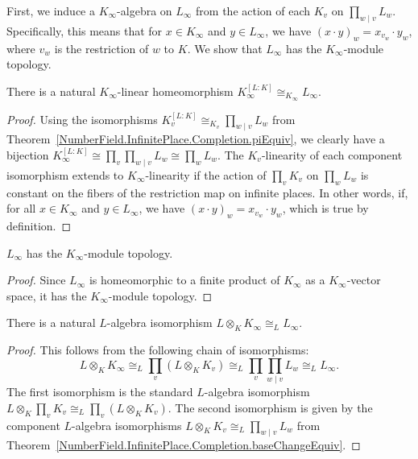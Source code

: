 First, we induce a $K_{\infty}$-algebra on $L_{\infty}$ from the action of each $K_v$ on
$\prod_{w\mid v}L_w$.
Specifically, this means that for $x \in K_{\infty}$ and $y \in L_{\infty}$, we have
$(x \cdot y)_w = x_{v_w} \cdot y_w$, where $v_w$ is the restriction of $w$ to $K$.
We show that $L_{\infty}$ has the $K_{\infty}$-module topology.

\begin{theorem}
  \label{NumberField.InfiniteAdeleRing.piEquiv}
  \leanok
  There is a natural $K_{\infty}$-linear homeomorphism
  $K_{\infty}^{[L:K]} \cong_{K_{\infty}} L_{\infty}$.
\end{theorem}
\begin{proof}
  Using the isomorphisms $K_v^{[L:K]} \cong_{K_v} \prod_{w\mid v}L_w$ from
  Theorem~\ref{NumberField.InfinitePlace.Completion.piEquiv}, we clearly have a bijection
  $K_{\infty}^{[L:K]} \cong \prod_v\prod_{w \mid v} L_w \cong \prod_w L_w$.
  The $K_v$-linearity of each component isomorphism extends to $K_{\infty}$-linearity if the
  action of $\prod_v K_v$ on $\prod_w L_w$ is constant on the fibers of the restriction map on
  infinite places.
  In other words, if, for all $x \in K_{\infty}$ and $y \in L_{\infty}$, we have
  $(x \cdot y)_w = x_{v_w} \cdot y_w$, which is true by definition.
\end{proof}

\begin{theorem}
  \label{NumberField.InfiniteAdeleRing.instIsModuleTopology_fLT}
  \leanok
  $L_{\infty}$ has the $K_{\infty}$-module topology.
\end{theorem}
\begin{proof}
  Since $L_{\infty}$ is homeomorphic to a finite product of $K_{\infty}$ as a $K_{\infty}$-vector
  space, it has the $K_{\infty}$-module topology.
\end{proof}

\begin{theorem}
  \label{NumberField.InfiniteAdeleRing.baseChangeEquivAux}
  \leanok
  There is a natural $L$-algebra isomorphism
  $L \otimes_K K_{\infty} \cong_L L_{\infty}$.
\end{theorem}
\begin{proof}
  This follows from the following chain of isomorphisms:
  \[
    L \otimes_K K_{\infty} \cong_L \prod_v (L \otimes_K K_v) \cong_L
      \prod_v \prod_{w\mid v}L_w \cong_L L_{\infty} .
  \]
  The first isomorphism is the standard $L$-algebra isomorphism
  $L \otimes_K \prod_v K_v \cong_L \prod_v (L \otimes_K K_v)$.
  The second isomorphism is given by the component $L$-algebra isomorphisms
  $L \otimes_K K_v \cong_L \prod_{w\mid v}L_w$ from
  Theorem~\ref{NumberField.InfinitePlace.Completion.baseChangeEquiv}.
\end{proof}

